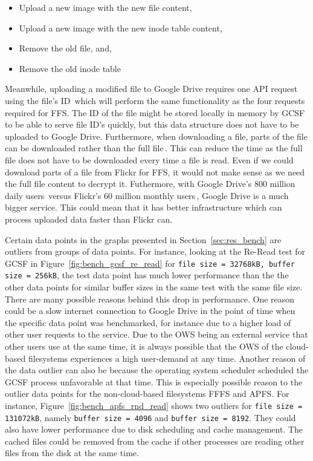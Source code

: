 \begin{itemize}
	\item Upload a new image with the new file content,
	\item Upload a new image with the new inode table content,
	\item Remove the old file, and,
	\item Remove the old inode table
\end{itemize}
Meanwhile, uploading a modified file to Google Drive requires one \gls{API} request using the file's ID\,\cite{FilesUpdateDrive2022} which will perform the same functionality as the four requests required for \gls{FFS}. The ID of the file might be stored locally in memory by \gls{GCSF} to be able to serve file ID's quickly, but this data structure does not have to be uploaded to Google Drive. Furthermore, when downloading a file, parts of the file can be downloaded rather than the full file\,\cite{googleDownloadFilesDrive2022}. This can reduce the time as the full file does not have to be downloaded every time a file is read. Even if we could download parts of a file from Flickr for \gls{FFS}, it would not make sense as we need the full file content to decrypt it. Futhermore, with Google Drive's 800 million daily users\,\cite{lardinoisGoogleUpdatesDrive2017} versus Flickr's 60 million monthly users\,\cite{campbellFlickrStatistics20222022}, Google Drive is a much bigger service. This could mean that it has better infrastructure which can process uploaded data faster than Flickr can.

Certain data points in the graphs presented in Section~\ref{sec:res_bench} are outliers from groups of data points. For instance, looking at the \mbox{Re-Read} test for \gls{GCSF} in Figure~\ref{fig:bench_gcsf_re_read} for \texttt{file size = 32768kB, buffer size = 256kB}, the test data point has much lower performance than the the other data points for similar buffer sizes in the same test with the same file size. There are many possible reasons behind this drop in performance. One reason could be a slow internet connection to Google Drive in the point of time when the specific data point was benchmarked, for instance due to a higher load of other user requests to the service. Due to the \gls{OWS} being an external service that other users use at the same time, it is always possible that the \gls{OWS} of the \mbox{cloud-based} filesystems experiences a high \mbox{user-demand} at any time. Another reason of the data outlier can also be because the operating system scheduler scheduled the \gls{GCSF} process unfavorable at that time. This is especially possible reason to the outlier data points for the \mbox{non-cloud-based} filesystems \gls{FFFS} and \gls{APFS}. For instance, Figure~\ref{fig:bench_apfs_rnd_read} shows two outliers for \texttt{file size = 131072kB}, namely \texttt{buffer size = 4096} and \texttt{buffer size = 8192}. They could also have lower performance due to disk scheduling and cache management. The cached files could be removed from the cache if other processes are reading other files from the disk at the same time.

